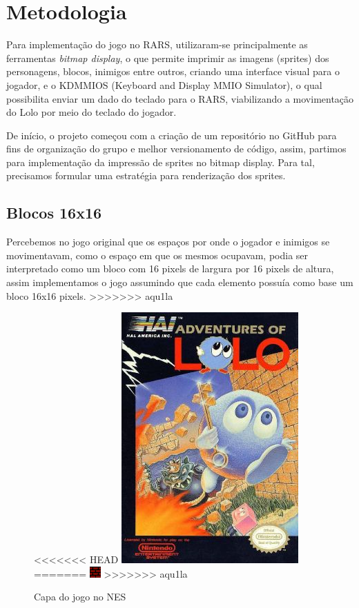 \documentclass[10pt, conference, compsocconf]{IEEEtran}
\begin{document}
\section{Metodologia}
\label{sec:Metodologia}

Para implementação do jogo no RARS, utilizaram-se principalmente as ferramentas
\textit{bitmap display}, o que permite imprimir as imagens (sprites) dos personagens,
blocos, inimigos entre outros, criando uma interface visual para o jogador, e o
KDMMIOS (Keyboard and Display MMIO Simulator), o qual possibilita enviar um dado
do teclado para o RARS, viabilizando a movimentação do Lolo por meio do teclado
do jogador.

De início, o projeto começou com a criação de um repositório no GitHub para fins
de organização do grupo e melhor versionamento de código, assim, partimos para
implementação da impressão de sprites no bitmap display. Para tal, precisamos
formular uma estratégia para renderização dos sprites.

\subsection{Blocos 16x16}{
\label{sec:MIPS}
Percebemos no jogo original que os espaços por onde
o jogador e inimigos se movimentavam, como o espaço
em que os mesmos ocupavam, podia ser interpretado
como um bloco com 16 pixels de largura por 16 pixels de altura, assim implementamos o jogo assumindo
que cada elemento possuía como base um bloco 16x16
pixels.
>>>>>>> aqu1la

}
\begin{figure}[htb]
  \begin{center}
<<<<<<< HEAD
   \includegraphics[width=0.3\linewidth]{./Figures/capa_lolo_nes.png}
=======
   \includegraphics[width=0.3\linewidth]{./Figures/image_2.png}
>>>>>>> aqu1la
  \end{center}
  \caption{Capa do jogo no NES}
  \label{fig:01}
\end{figure}
\end{document}
